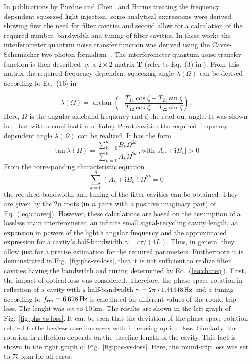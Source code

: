In publications by Purdue and Chen~\cite{PurduePRD66} and Harms \cite{HarmsPRD68} treating the frequency dependent squeezed light injection, some analytical expressions were derived showing first the need for filter cavities and second allow for a calculation of the required number,  bandwidth and tuning of filter cavities.
In these works the interferometer quantum noise transfer function was derived using the Caves-Schumacher two-photon formalism~\cite{Caves}. The interferometer quantum noise transfer function is then described by a $2\times 2$-matrix $\mathbf{T}$ (refer to Eq.~(3) in \cite{HarmsPRD68}).  From this matrix the required frequency-dependent squeezing angle $\lambda(\Omega)$ can be derived according to Eq.~(16) in \cite{HarmsPRD68}


\begin{equation}
\lambda(\Omega) = \arctan\left(-\frac{T_{11}\cos\zeta + T_{21}\sin\zeta}{T_{12}\cos\zeta + T_{22}\sin\zeta}\right)\,.\label{eq:lopt}
\end{equation}
Here, $\Omega$ is the angular sideband frequency and $\zeta$ the read-out angle. It was shown in \cite{PurduePRD66}, that with a combination of Fabry-Perot cavities the required frequency dependent angle $\lambda(\Omega)$ can be realized. It  has the form \cite{PurduePRD66}
\begin{equation}
\tan\lambda(\Omega) = \frac{\sum_{k=0}^{n} B_k\Omega^{2k}}{ \sum_{k=0}^{n} A_k\Omega^{2k}}\,, \text{with}\, \left|A_n+\mathrm{i}B_n\right|>0
\end{equation}
From the corresponding characteristic equation
\begin{equation}
\sum_{k=0}^{n} \left(A_k+\mathrm{i}B_k\right)\Omega^{2k}=0\label{eq:chareq}
\end{equation}
the required bandwidth and tuning of the filter cavities can be obtained. They are given by the $2n$ roots (in $n$ pairs with a positive imaginary part) of Eq.~(\ref{eq:chareq}).
However, these calculations are based on the assumption of a lossless main interferometer, an infinite small signal-recycling cavity length,  an expansion in powers of the light's angular frequency and the approximated expression for a cavity's half-bandwidth $\gamma=c\tau/(4L)$. Thus, in general they allow just for a precise estimation for the required parameters.
Furthermore it is demonstrated in Fig.~\ref{fig:phs-vs-loss}, that it is not sufficient to realize filter cavities having the bandwidth and tuning determined by Eq.~(\ref{eq:chareq}).   First, the impact of optical loss was considered. Therefore, the phase-space rotation in reflection of a cavity with a half-bandwidth $\gamma=2\pi\cdot1.44448\,\rm Hz$ and a tuning according  to $f_{\rm res} = 6.628\,\rm Hz$ is calculated for different values of the round-trip loss. The lenght was set to 10\,km. The results are shown in the left graph of Fig.~\ref{fig:phs-vs-loss}. It can be seen that the deviation of the phase-space rotation related to the lossless case increases with increasing optical loss. Similarly, the rotation in reflection depends on the baseline length of the cavity. This fact is shown in the right graph of Fig.~\ref{fig:phs-vs-loss}. Here, the round-trip loss was set to 75\,ppm for all cases.


